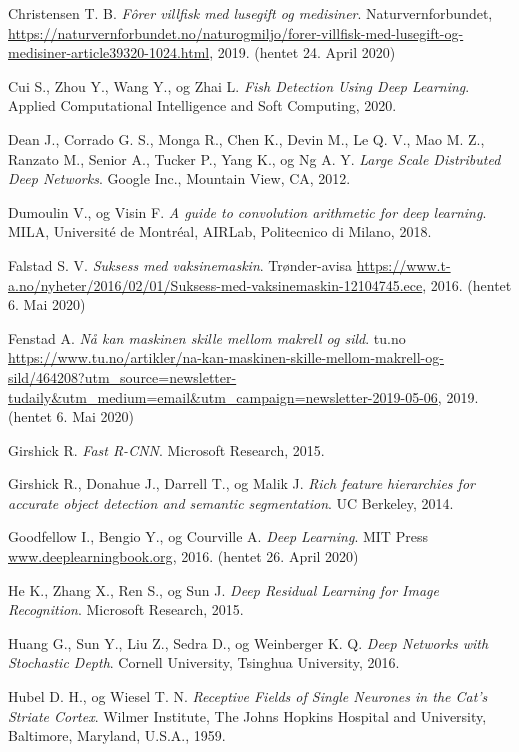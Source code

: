 \documentclass[11ot]{article}
\begin{document}
\begin{thebibliography}{9}
Christensen T. B. 
\textit{Fôrer villfisk med lusegift og medisiner}. 
Naturvernforbundet, \url{https://naturvernforbundet.no/naturogmiljo/forer-villfisk-med-lusegift-og-medisiner-article39320-1024.html}, 2019. (hentet 24. April 2020)

Cui S., Zhou Y., Wang Y., og Zhai L. 
\textit{Fish Detection Using Deep Learning}. 
Applied Computational Intelligence and Soft Computing, 2020.

Dean J., Corrado G. S., Monga R., Chen K., Devin M., Le Q. V., Mao M. Z., Ranzato M., Senior A., Tucker P., Yang K., og Ng A. Y. 
\textit{Large Scale Distributed Deep Networks}. 
Google Inc., Mountain View, CA, 2012.

Dumoulin V., og Visin F. 
\textit{A guide to convolution arithmetic for deep learning}. 
MILA, Université de Montréal, AIRLab, Politecnico di Milano, 2018.

Falstad S. V.
\textit{Suksess med vaksinemaskin}. 
Trønder-avisa \url{https://www.t-a.no/nyheter/2016/02/01/Suksess-med-vaksinemaskin-12104745.ece}, 2016. (hentet 6. Mai 2020)

Fenstad A.
\textit{Nå kan maskinen skille mellom makrell og sild}. 
tu.no \url{https://www.tu.no/artikler/na-kan-maskinen-skille-mellom-makrell-og-sild/464208?utm_source=newsletter-tudaily&utm_medium=email&utm_campaign=newsletter-2019-05-06}, 2019. (hentet 6. Mai 2020)

Girshick R. 
\textit{Fast R-CNN}. 
Microsoft Research, 2015.

Girshick R., Donahue J., Darrell T., og Malik J. 
\textit{Rich feature hierarchies for accurate object detection and semantic segmentation}. 
UC Berkeley, 2014.

Goodfellow I., Bengio Y., og Courville A. 
\textit{Deep Learning}. 
MIT Press \url{www.deeplearningbook.org}, 2016. (hentet 26. April 2020)

He K., Zhang X., Ren S., og Sun J. 
\textit{Deep Residual Learning for Image Recognition}. 
Microsoft Research, 2015.

Huang G., Sun Y., Liu Z., Sedra D., og Weinberger K. Q. 
\textit{Deep Networks with Stochastic Depth}. 
Cornell University, Tsinghua University, 2016.

Hubel D. H., og Wiesel T. N. 
\textit{Receptive Fields of Single Neurones in the Cat's Striate Cortex}. 
 Wilmer Institute, The Johns Hopkins Hospital and University, Baltimore, Maryland, U.S.A., 1959.
 

\end{thebibliography}
\end{document}

